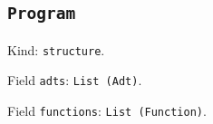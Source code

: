 \documentclass[11pt]{article}
\begin{document}
\subsection*{\texttt{Program}}
\noindent Kind: \texttt{structure}.\par
\noindent Field \texttt{adts}: \texttt{List (Adt)}.\par
\noindent Field \texttt{functions}: \texttt{List (Function)}.\par
\end{document}
